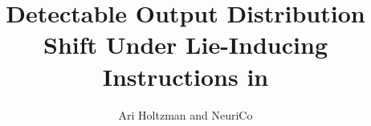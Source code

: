 \documentclass{article}
\title{Detectable Output Distribution Shift Under Lie-Inducing Instructions in \gptmodel}
\author{Ari Holtzman and NeuriCo}
\begin{document}
\maketitle

\begin{abstract}

\end{abstract}









\end{document}
